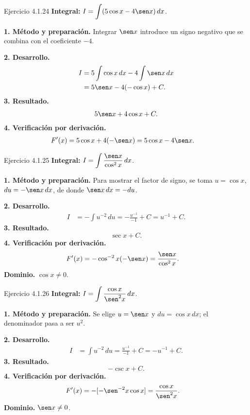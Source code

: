 \begin{examplebox}{Ejercicio 4.1.24}
\textbf{Integral:} $\displaystyle I=\int (5\cos x-4\sen x)\,dx$.

\textbf{1. Método y preparación.} Integrar $\sen x$ introduce un signo negativo que se combina con el coeficiente $-4$.

\textbf{2. Desarrollo.}
\begin{align*}
I&=5\int\cos x\,dx-4\int\sen x\,dx\\&=5\sen x-4(-\cos x)+C.
\end{align*}
\textbf{3. Resultado.}
\[
5\sen x+4\cos x+C.
\]
\textbf{4. Verificación por derivación.}
\begin{align*}
F'(x)&=5\cos x+4(-\sen x)=5\cos x-4\sen x.
\end{align*}
\end{examplebox}

\begin{examplebox}{Ejercicio 4.1.25}
\textbf{Integral:} $\displaystyle I=\int \frac{\sen x}{\cos^2x}\,dx$.

\textbf{1. Método y preparación.} Para mostrar el factor de signo, se toma $u=\cos x$, $du=-\sen x\,dx$, de donde $\sen x\,dx=-du$.

\textbf{2. Desarrollo.}
\begin{align*}
I&=-\int u^{-2}\,du=-\frac{u^{-1}}{-1}+C=u^{-1}+C.
\end{align*}
\textbf{3. Resultado.}
\[
\sec x+C.
\]
\textbf{4. Verificación por derivación.}
\begin{align*}
F'(x)&=-\cos^{-2}x(-\sen x)=\frac{\sen x}{\cos^2x}.
\end{align*}
\textbf{Dominio.} $\cos x\ne0$.
\end{examplebox}

\begin{examplebox}{Ejercicio 4.1.26}
\textbf{Integral:} $\displaystyle I=\int \frac{\cos x}{\sen^2x}\,dx$.

\textbf{1. Método y preparación.} Se elige $u=\sen x$ y $du=\cos x\,dx$; el denominador pasa a ser $u^2$.

\textbf{2. Desarrollo.}
\begin{align*}
I&=\int u^{-2}\,du=\frac{u^{-1}}{-1}+C=-u^{-1}+C.
\end{align*}
\textbf{3. Resultado.}
\[
-\csc x+C.
\]
\textbf{4. Verificación por derivación.}
\begin{align*}
F'(x)&=-[-\sen^{-2}x\cos x]=\frac{\cos x}{\sen^2x}.
\end{align*}
\textbf{Dominio.} $\sen x\ne0$.
\end{examplebox}

